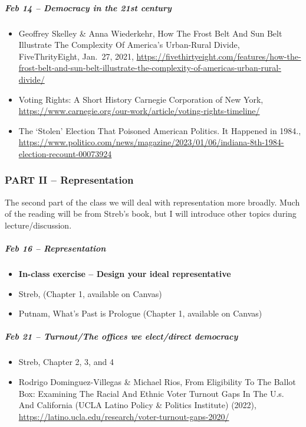 \documentclass[
]{article}
\providecommand{\tightlist}{%
  \setlength{\itemsep}{0pt}\setlength{\parskip}{0pt}}
\begin{document}
\hypertarget{feb-14-democracy-in-the-21st-century}{%
\subparagraph{Feb 14 -- Democracy in the 21st
century}\label{feb-14-democracy-in-the-21st-century}}

\begin{itemize}
\tightlist
\item
  Geoffrey Skelley \& Anna Wiederkehr, How The Frost Belt And Sun Belt
  Illustrate The Complexity Of America's Urban-Rural Divide,
  FiveThrityEight, Jan.~27, 2021,
  \url{https://fivethirtyeight.com/features/how-the-frost-belt-and-sun-belt-illustrate-the-complexity-of-americas-urban-rural-divide/}
\item
  Voting Rights: A Short History Carnegie Corporation of New York,
  \url{https://www.carnegie.org/our-work/article/voting-rights-timeline/}
\item
  The `Stolen' Election That Poisoned American Politics. It Happened in
  1984.,
  \url{https://www.politico.com/news/magazine/2023/01/06/indiana-8th-1984-election-recount-00073924}
\end{itemize}

\hypertarget{part-ii-representation}{%
\subsubsection{PART II -- Representation}\label{part-ii-representation}}

The second part of the class we will deal with representation more
broadly. Much of the reading will be from Streb's book, but I will
introduce other topics during lecture/discussion.

\hypertarget{feb-16-representation}{%
\subparagraph{Feb 16 -- Representation}\label{feb-16-representation}}

\begin{itemize}
\tightlist
\item
  \textbf{In-class exercise -- Design your ideal representative}
\item
  Streb, (Chapter 1, available on Canvas)
\item
  Putnam, What's Past is Prologue (Chapter 1, available on Canvas)
\end{itemize}

\hypertarget{feb-21-turnoutthe-offices-we-electdirect-democracy}{%
\subparagraph{Feb 21 -- Turnout/The offices we elect/direct
democracy}\label{feb-21-turnoutthe-offices-we-electdirect-democracy}}

\begin{itemize}
\tightlist
\item
  Streb, Chapter 2, 3, and 4
\item
  Rodrigo Dominguez-Villegas \& Michael Rios, From Eligibility To The
  Ballot Box: Examining The Racial And Ethnic Voter Turnout Gaps In The
  U.s. And California (UCLA Latino Policy \& Politics Institute) (2022),
  \url{https://latino.ucla.edu/research/voter-turnout-gaps-2020/}
\end{itemize}
\end{document}
